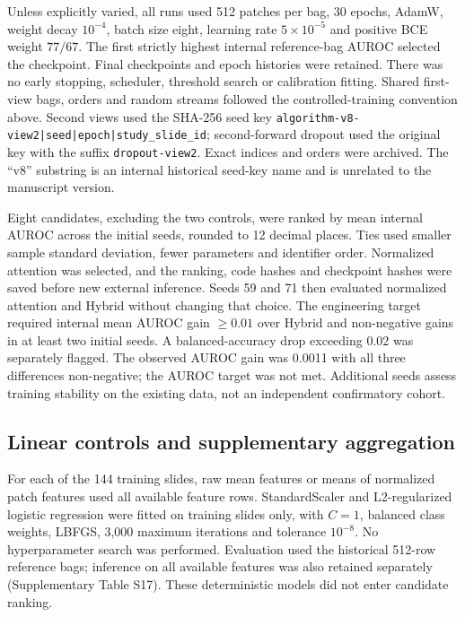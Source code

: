 Unless explicitly varied, all runs used 512 patches per bag, 30 epochs, AdamW, weight decay $10^{-4}$, batch size eight, learning rate $5\times10^{-5}$ and positive BCE weight $77/67$. The first strictly highest internal reference-bag AUROC selected the checkpoint. Final checkpoints and epoch histories were retained. There was no early stopping, scheduler, threshold search or calibration fitting. Shared first-view bags, orders and random streams followed the controlled-training convention above. Second views used the SHA-256 seed key \texttt{algorithm-v8-view2|seed|epoch|study\_slide\_id}; second-forward dropout used the original key with the suffix \texttt{dropout-view2}. Exact indices and orders were archived. The ``v8'' substring is an internal historical seed-key name and is unrelated to the manuscript version.

Eight candidates, excluding the two controls, were ranked by mean internal AUROC across the initial seeds, rounded to 12 decimal places. Ties used smaller sample standard deviation, fewer parameters and identifier order. Normalized attention was selected, and the ranking, code hashes and checkpoint hashes were saved before new external inference. Seeds 59 and 71 then evaluated normalized attention and Hybrid without changing that choice. The engineering target required internal mean AUROC gain $\geq0.01$ over Hybrid and non-negative gains in at least two initial seeds. A balanced-accuracy drop exceeding 0.02 was separately flagged. The observed AUROC gain was 0.0011 with all three differences non-negative; the AUROC target was not met. Additional seeds assess training stability on the existing data, not an independent confirmatory cohort.

\subsection{Linear controls and supplementary aggregation}

For each of the 144 training slides, raw mean features or means of normalized patch features used all available feature rows. StandardScaler and L2-regularized logistic regression were fitted on training slides only, with $C=1$, balanced class weights, LBFGS, 3,000 maximum iterations and tolerance $10^{-8}$. No hyperparameter search was performed. Evaluation used the historical 512-row reference bags; inference on all available features was also retained separately (Supplementary Table S17). These deterministic models did not enter candidate ranking.

